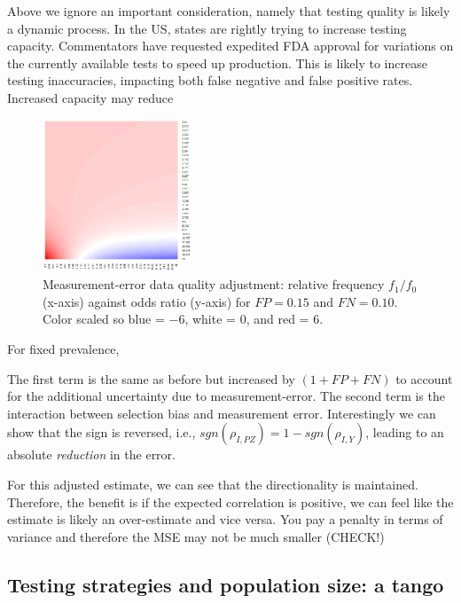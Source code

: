 \documentclass[12pt]{article}
\numberwithin{equation}{section}
\theoremstyle{plain}
\begin{document}
Above we ignore an important consideration, namely that testing quality is likely a dynamic process.  In the US, states are rightly trying to increase testing capacity.  Commentators have requested expedited FDA approval for variations on the currently available tests to speed up production.  This is likely to increase testing inaccuracies, impacting both false negative and false positive rates.  Increased capacity may reduce

\newpage

\begin{figure}
\centering
\includegraphics[width = 0.4\textwidth]{../methods/figs/mem_heatmap_article.png}
\caption{Measurement-error data quality adjustment: relative frequency $f_1/f_0$ (x-axis) against odds ratio (y-axis) for $FP=0.15$ and $FN=0.10$. Color scaled so blue = $-6$, white = 0, and red = $6$.}
\end{figure}




For fixed prevalence,


The first term is the same as before but increased by $(1 + FP + FN)$ to account for the additional uncertainty due to measurement-error.  The second term is the interaction between selection bias and measurement error.  Interestingly we can show that the sign is reversed, i.e., $sgn(\rho_{I,PZ}) = 1 - sgn(\rho_{I,Y})$, leading to an absolute \emph{reduction} in the error.

For this adjusted estimate, we can see that the directionality is maintained.  Therefore, the benefit is if the expected correlation is positive, we can feel like the estimate is likely an over-estimate and vice versa.  You pay a penalty in terms of variance and therefore the MSE may not be much smaller (CHECK!)


\subsection{Testing strategies and population size: a tango}
\end{document}
